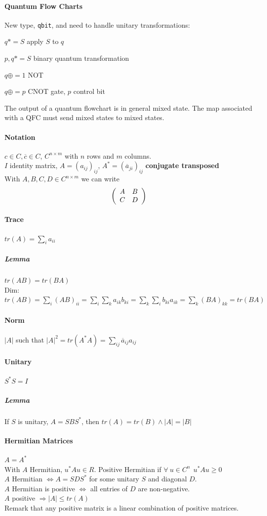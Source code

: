 \documentclass[10pt]{report}
\begin{document}
\paragraph{Quantum Flow Charts} New type, \texttt{qbit}, and need to handle unitary transformations:
\begin{list}{}{}
	\item $q*=S$ apply $S$ to $q$
	\item $p,q*=S$ binary quantum transformation
	\item $q\oplus =1$ NOT
	\item $q\oplus =p$ CNOT gate, $p$ control bit
\end{list}
The output of a quantum flowchart is in general mixed state. The map associated with a QFC must send mixed states to mixed states.
\paragraph{Notation} $c\in C, \overline{c} \in C$, $C^{n\times m}$ with $n$ rows and $m$ columns.\\
$I$ identity matrix, $A= (a_{ij})_{ij}$, $A^* = (\overline{a}_{ji})_{ij}$ \textbf{conjugate transposed}\\
With $A,B,C,D\in C^{n\times m}$ we can write
$$\left(\begin{array}{c c}
A & B \\ C & D
\end{array}\right)$$
\paragraph{Trace} $tr(A) = \sum_i a_{ii}$
\subparagraph{Lemma} $tr(AB) = tr(BA)$\\
Dim: $tr(AB) = \sum_i (AB)_{ii} = \sum_i \sum_k a_{ik}b_{ki} = \sum_k\sum_i b_{ki}a_{ik} = \sum_k (BA)_{kk} = tr(BA)$
\paragraph{Norm} $|A|$ such that $|A|^2 = tr(A^*A) = \sum_{ij}\overline{a}_{ij}a_{ij}$
\paragraph{Unitary} $S^*S = I$
\subparagraph{Lemma} If $S$ is unitary, $A = SBS^*$, then $tr(A) = tr(B)\wedge |A| = |B|$
\paragraph{Hermitian Matrices} $A = A^*$\\
With $A$ Hermitian, $u^*Au\in R$. Positive Hermitian if $\forall\:u\in C^n\:\:u^*Au \geq 0$\\
$A$ Hermitian $\Leftrightarrow A = SDS^*$ for some unitary $S$ and diagonal $D$.\\
$A$ Hermitian is positive $\Leftrightarrow$ all entries of $D$ are non-negative.\\
$A$ positive $\Rightarrow |A| \leq tr(A)$\\
Remark that any positive matrix is a linear combination of positive matrices.
\end{document}
